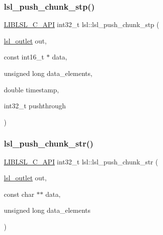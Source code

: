 \subsubsection{\texorpdfstring{lsl\+\_\+push\+\_\+chunk\+\_\+stp()}{lsl\_push\_chunk\_stp()}}
{\footnotesize\ttfamily \hyperlink{lsl__cpp_8h_aafd0ef1813e8be84a1420c4f1df64615}{L\+I\+B\+L\+S\+L\+\_\+\+C\+\_\+\+A\+PI} int32\+\_\+t lsl\+::lsl\+\_\+push\+\_\+chunk\+\_\+stp (\begin{DoxyParamCaption}\item[{\hyperlink{namespacelsl_abcf512b0f66dacf86c10b165995fd50b}{lsl\+\_\+outlet}}]{out,  }\item[{const int16\+\_\+t $\ast$}]{data,  }\item[{unsigned long}]{data\+\_\+elements,  }\item[{double}]{timestamp,  }\item[{int32\+\_\+t}]{pushthrough }\end{DoxyParamCaption})}

\mbox{\label{namespacelsl_af3a72a206c0eac2ac180b31e5fbaf28f}} 
\subsubsection{\texorpdfstring{lsl\+\_\+push\+\_\+chunk\+\_\+str()}{lsl\_push\_chunk\_str()}}
{\footnotesize\ttfamily \hyperlink{lsl__cpp_8h_aafd0ef1813e8be84a1420c4f1df64615}{L\+I\+B\+L\+S\+L\+\_\+\+C\+\_\+\+A\+PI} int32\+\_\+t lsl\+::lsl\+\_\+push\+\_\+chunk\+\_\+str (\begin{DoxyParamCaption}\item[{\hyperlink{namespacelsl_abcf512b0f66dacf86c10b165995fd50b}{lsl\+\_\+outlet}}]{out,  }\item[{const char $\ast$$\ast$}]{data,  }\item[{unsigned long}]{data\+\_\+elements }\end{DoxyParamCaption})}

\mbox{\label{namespacelsl_a3327c2e5a83c90e02270743916c302e3}} 

